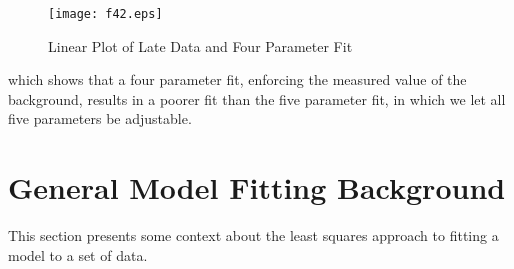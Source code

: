 \documentclass[12pt]{article}
\begin{document}
\begin{figure} [h]
   \centerline{\texttt{[image: f42.eps]} }
	\caption{Linear Plot of Late Data and Four Parameter Fit }
\end{figure}    

\noindent which shows that a four parameter fit, enforcing the measured
  value of the background, results in a poorer fit than the five parameter
  fit, in which we let all five parameters be adjustable.
\section{General Model Fitting Background}
This section presents some context about the least squares approach
  to fitting a model to a set of data.\\   
  
\end{document}
